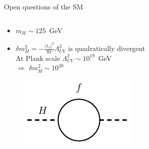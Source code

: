 \documentclass[10pt]{beamer}
\begin{document}
\begin{frame}{Open questions of the SM}
\begin{columns}
\begin{column}{0.7\textwidth}
\begin{itemize}
                \begin{itemize}
                    \item $m_H \sim 125$~GeV
                    \item $\delta m^2_H = - \frac{|\lambda_{f}|^{2}}{8\pi}\Lambda_{UV}^{2}$ is quadratically divergent\\
                    At Plank scale $\Lambda_{UV}^{2} \sim 10^{19}$~GeV\\ $\Rightarrow$ $\delta m^2_H \sim 10^{38}$
                \end{itemize}
                \vspace{-0.5cm}
                \begin{figure}
                    \includegraphics[scale=1.0]{figures/one-loop-correction-1.pdf}
                \end{figure}
            \end{itemize}
        \end{column}
    \end{columns}
    
\end{frame}
\end{document}
